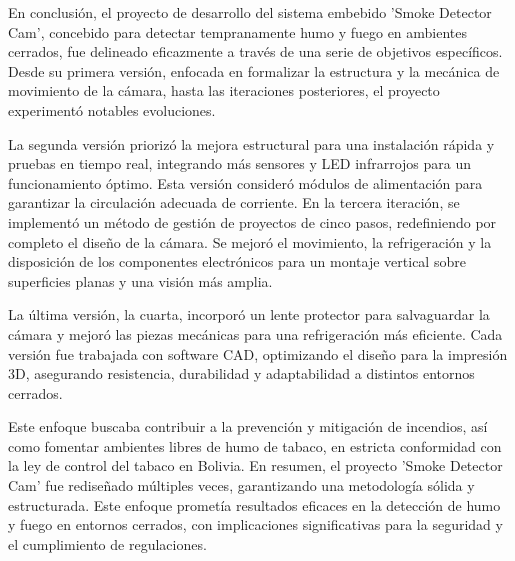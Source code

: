 En conclusión, el proyecto de desarrollo del sistema embebido 'Smoke Detector Cam', concebido para detectar tempranamente humo y fuego en ambientes cerrados, fue delineado eficazmente a través de una serie de objetivos específicos. Desde su primera versión, enfocada en formalizar la estructura y la mecánica de movimiento de la cámara, hasta las iteraciones posteriores, el proyecto experimentó notables evoluciones.

La segunda versión priorizó la mejora estructural para una instalación rápida y pruebas en tiempo real, integrando más sensores y LED infrarrojos para un funcionamiento óptimo. Esta versión consideró módulos de alimentación para garantizar la circulación adecuada de corriente. En la tercera iteración, se implementó un método de gestión de proyectos de cinco pasos, redefiniendo por completo el diseño de la cámara. Se mejoró el movimiento, la refrigeración y la disposición de los componentes electrónicos para un montaje vertical sobre superficies planas y una visión más amplia.

La última versión, la cuarta, incorporó un lente protector para salvaguardar la cámara y mejoró las piezas mecánicas para una refrigeración más eficiente. Cada versión fue trabajada con software CAD, optimizando el diseño para la impresión 3D, asegurando resistencia, durabilidad y adaptabilidad a distintos entornos cerrados.

Este enfoque buscaba contribuir a la prevención y mitigación de incendios, así como fomentar ambientes libres de humo de tabaco, en estricta conformidad con la ley de control del tabaco en Bolivia. En resumen, el proyecto 'Smoke Detector Cam' fue rediseñado múltiples veces, garantizando una metodología sólida y estructurada. Este enfoque prometía resultados eficaces en la detección de humo y fuego en entornos cerrados, con implicaciones significativas para la seguridad y el cumplimiento de regulaciones.